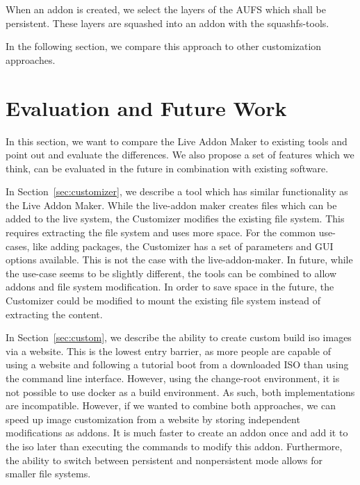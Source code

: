 \documentclass[english]{lni}
\begin{document}
When an addon is created, we select the layers of the AUFS which shall be persistent.
These layers are squashed into an addon with the squashfs-tools.

In the following section, we compare this approach to other customization approaches.

\section{Evaluation and Future Work}

In this section, we want to compare the Live Addon Maker to existing tools and point out and evaluate the differences.
We also propose a set of features which we think, can be evaluated in the future in combination with existing software.

In Section~\ref{sec:customizer}, we describe a tool which has similar functionality as the Live Addon Maker.
While the live-addon maker creates files which can be added to the live system,
the Customizer modifies the existing file system.
This requires extracting the file system and uses more space.
For the common use-cases, like adding packages, the Customizer has a set of parameters and GUI options available.
This is not the case with the live-addon-maker.
In future, while the use-case seems to be slightly different, the tools can be combined to allow addons and file system modification.
In order to save space in the future, the Customizer could be modified to mount the existing file system instead of extracting the content.

In Section~\ref{sec:custom}, we describe the ability to create custom build iso images via a website. %
This is the lowest entry barrier, as more people are capable of using a website and following a tutorial boot from a downloaded ISO than using the command line interface.
However, using the change-root environment, it is not possible to use docker as a build environment. %
As such, both implementations are incompatible. %
However, if we wanted to combine both approaches, we can speed up image customization from a website by storing independent modifications as addons.
It is much faster to create an addon once and add it to the iso later than executing the commands to modify this addon. %
Furthermore, the ability to switch between persistent and nonpersistent mode allows for smaller file systems.
\end{document}
